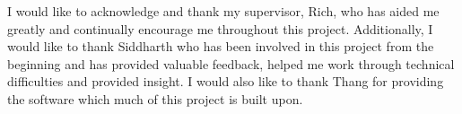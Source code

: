 
\begin{acknowledgements}      

I would like to acknowledge and thank my supervisor, Rich, who has aided me greatly and continually encourage me throughout this project. Additionally, I would like to thank Siddharth who has been involved in this project from the beginning and has provided valuable feedback, helped me work through technical difficulties and provided insight. I would also like to thank Thang for providing the software which much of this project is built upon. 

\end{acknowledgements}
